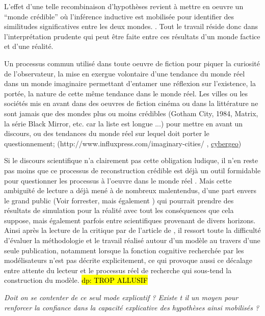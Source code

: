L'effet d'une telle recombinaison d'hypothèses revient à mettre en oeuvre un \enquote{monde crédible} où l'inférence inductive est mobilisée pour identifier des similitudes significatives entre les deux mondes. \autocites{Livet2006, Phan2008}. Tout le travail réside donc dans l'interprétation prudente qui peut être faite entre ces résultats d'un monde factice et d'une réalité.

Un processus commun utilisé dans toute oeuvre de fiction pour piquer la curiosité de l'observateur, la mise en exergue volontaire d'une tendance du monde réel dans un monde imaginaire permettant d'entamer une réflexion sur l'existence, la portée, la nature de cette même tendance dans le monde réel. Les villes ou les sociétés mis en avant dans des oeuvres de fiction cinéma ou dans la littérature ne sont jamais que des mondes plus ou moins crédibles (Gotham City, 1984, Matrix, la série Black Mirror, etc. car la liste est longue ...)  pour mettre en avant un discours, ou des tendances du monde réel sur lequel doit porter le questionnement; (http://www.influxpress.com/imaginary-cities/ , \href{http://cybergeo.revues.org/1170#tocto1n9?}{cybergeo})

Si le discours scientifique n'a clairement pas cette obligation ludique, il n'en reste pas moins que ce processus de reconstruction crédible est déjà un outil formidable pour questionner les processus à l'oeuvre dans le monde réel . Mais cette ambiguïté de lecture a déjà mené à de nombreux malentendus, d'une part envers le grand public (Voir forrester, mais également ) qui pourrait prendre des résultats de simulation pour la réalité avec tout les conséquences que cela suppose, mais également parfois entre scientifiques provenant de divers horizons. Ainsi après la lecture de la critique par \textcite{Chattoe2011} de l'article de \textcite{Yanoff2009}, il ressort toute la difficulté d'évaluer la méthodologie et le travail réalisé autour d'un modèle au travers d'une seule publication, notamment lorsque la fonction cognitive recherchée par les modélisateurs n'est pas décrite explicitement, ce qui provoque aussi ce décalage entre attente du lecteur et le processus réel de recherche qui sous-tend la construction du modèle. \hl{dp: TROP ALLUSIF}

\textit{Doit on se contenter de ce seul mode explicatif ? Existe t il un moyen pour renforcer la confiance dans la capacité explicative des hypothèses ainsi mobilisés ? } 


